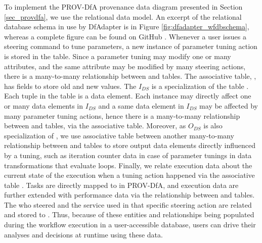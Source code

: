 To implement the PROV-DfA provenance data diagram presented in Section \ref{sec_provdfa}, we use the relational data model.
An excerpt of the relational database schema in use by DfAdapter is in Figure \ref{fig:dfadapter_wfdbschema}, whereas a complete figure can be found
on GitHub \cite{DfAdapterGitHubDfAdapter}.
Whenever a user issues a steering command to tune parameters, a new
instance of parameter tuning action is stored in the 
table. Since a parameter tuning may modify one or many attributes, and
the same attribute may be modified by many steering actions, there is a
many-to-many relationship between  and  tables.
The associative table, , has fields to store old and new
values. The $I_{DS}$ is a specialization of the table .
Each tuple in the  table is a data element.
Each 
instance may directly affect one or many data elements in
$I_{DS}$ and a same data element in $I_{DS}$ may be
affected by many parameter tuning actions, hence there is a many-to-many
relationship between  and  tables, via the
 associative table.
Moreover, as
$O_{DS}$ is also specialization of , we use
 associative table between another many-to-many
relationship between  and  tables to store output
data elements directly influenced by a tuning, such as iteration counter
data in case of parameter tunings in data transformations that evaluate
loops. Finally, we relate execution data about the current state of the
execution when a tuning action happened via the associative table
.
Tasks are directly mapped to 
in PROV-DfA, and execution data are further extended with
performance data via the relationship between  and 
tables. The  who steered and the  service used in that
specific steering action are related and stored to . Thus, because
of these entities and relationships being populated during the workflow execution in a user-accessible database, users can drive their
analyses and decisions at runtime using these data.

